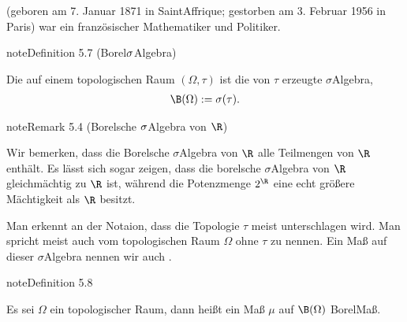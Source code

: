 \documentclass[letterpaper,10pt,german]{jupyterBook}
\begin{document}
\begin{sphinxShadowBox}
\sphinxstylesidebartitle{}

\sphinxAtStartPar
{} (geboren am 7. Januar 1871 in Saint\sphinxhyphen{}Affrique; gestorben am 3. Februar 1956 in Paris) war ein französischer Mathematiker und Politiker.
\end{sphinxShadowBox}
\label{masstheorie/masstheorie:definition-14}
\begin{sphinxadmonition}{note}{Definition 5.7 (Borel\sphinxhyphen{}\protect\(\sigma\protect\)\sphinxhyphen{}Algebra)}



\sphinxAtStartPar
Die  auf einem topologischen Raum \((\Omega, \tau)\) ist die von \(\tau\) erzeugte \(\sigma\)\sphinxhyphen{}Algebra,
\begin{equation*}
\begin{split}\B(\Omega) := \sigma(\tau).\end{split}
\end{equation*}\end{sphinxadmonition}
\label{masstheorie/masstheorie:remark-15}
\begin{sphinxadmonition}{note}{Remark 5.4 (Borelsche \protect\(\sigma\protect\)\sphinxhyphen{}Algebra von \protect\(\R\protect\))}



\sphinxAtStartPar
Wir bemerken, dass die Borelsche \(\sigma\)\sphinxhyphen{}Algebra von \(\R\)  alle Teilmengen von \(\R\) enthält.
Es lässt sich sogar zeigen, dass die borelsche \(\sigma\)\sphinxhyphen{}Algebra von \(\R\) gleichmächtig zu \(\R\) ist, während die Potenzmenge \(2^\R\) eine echt größere Mächtigkeit als \(\R\) besitzt.
\end{sphinxadmonition}

\sphinxAtStartPar
Man erkennt an der Notaion, dass die Topologie \(\tau\) meist unterschlagen wird. Man spricht meist auch vom topologischen Raum \(\Omega\) ohne \(\tau\) zu nennen.
Ein Maß auf dieser \(\sigma\)\sphinxhyphen{}Algebra nennen wir auch .
\label{masstheorie/masstheorie:definition-16}
\begin{sphinxadmonition}{note}{Definition 5.8}



\sphinxAtStartPar
Es sei \(\Omega\) ein topologischer Raum, dann heißt ein Maß \(\mu\) auf \(\B(\Omega)\) Borel\sphinxhyphen{}Maß.
\end{sphinxadmonition}
\end{document}
